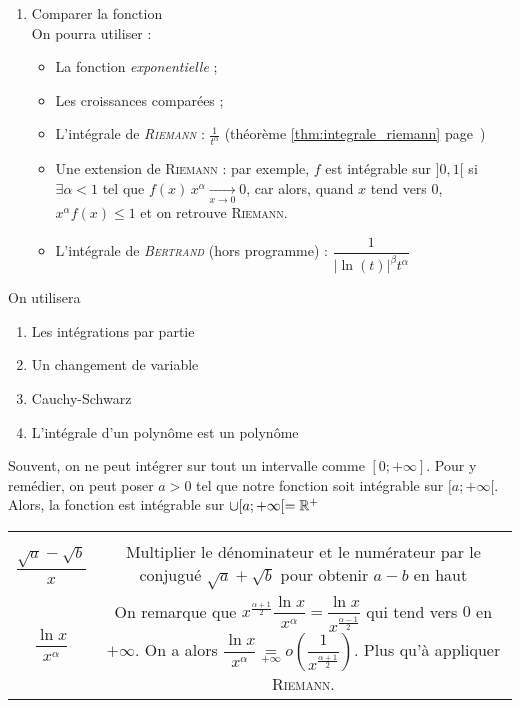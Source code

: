 \documentclass[11pt,a4paper,fleqn,pdftex]{report}
\begin{document}
\begin{methode}
\begin{enumerate}
\begin{itemize}
	\end{itemize}
	\item Comparer la fonction \hfill \\ On pourra utiliser :
	\begin{itemize}\itemsep2pt
		\item La fonction \emph{exponentielle} ; %
        \item Les croissances comparées ;
		\item L'intégrale de \emph{\textsc{Riemann}} : $\frac{1}{t^\alpha}$ (théorème \ref{thm:integrale_riemann} page~\pageref{thm:integrale_riemann}) \\
        \item Une extension de \textsc{Riemann} : par exemple, $f$ est intégrable sur $]0,1[$ si $\exists \alpha < 1$ tel que $f(x)\, x^\alpha \xrightarrow[x \to 0]{} 0$, car alors, quand $x$ tend vers $0$, $x^\alpha f(x) \le 1$ et on retrouve \textsc{Riemann}.
		\item L'intégrale de \emph{\textsc{Bertrand}} (hors programme) : $\dfrac{1}{|\ln (t)|^\beta t^\alpha}$
	\end{itemize}
\end{enumerate}
On utilisera
\begin{enumerate}
	\item Les intégrations par partie
	\item Un changement de variable
	\item Cauchy-Schwarz
	\item L'intégrale d'un polynôme est un polynôme
\end{enumerate}
Souvent, on ne peut intégrer sur tout un intervalle comme $[0;+\infty ]$. Pour y remédier, on peut poser $a>0$ tel que notre fonction soit intégrable sur $[a;+ \infty [$. Alors, la fonction est intégrable sur $\cup [a;+\infty [ = \mathbb{R}{}^+$
\begin{tabulary}{\textwidth}{| c | C |}
      &  \\
     $\dfrac{\sqrt{a} - \sqrt{b}}{x}$ & Multiplier le dénominateur et le numérateur par le conjugué $\sqrt{a}+\sqrt{b}$ pour obtenir $a-b$ en haut \\
     $\dfrac{\ln x}{x^\alpha}$ & On remarque que $x^{\frac{\alpha + 1}{2}}\dfrac{\ln x}{x^\alpha} = \dfrac{\ln x}{x^{\frac{\alpha - 1}{2}}}$ qui tend vers $0$ en $+\infty$. On a alors $\dfrac{\ln x}{x^\alpha}\underset{+\infty}{=}o \left( \dfrac{1}{x^{\frac{\alpha + 1}{2}}} \right) $. Plus qu'à appliquer \textsc{Riemann}. \\

\end{tabulary}
\end{methode}
\end{document}
